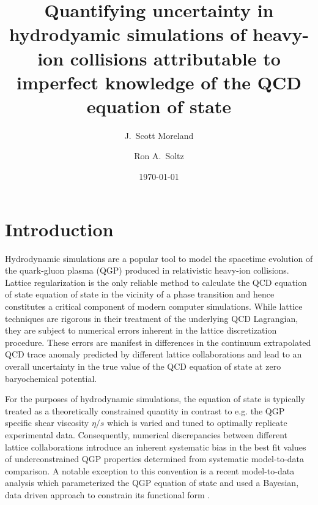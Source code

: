 \documentclass[aps,prc,reprint,amsmath,nofootinbib,superscriptaddress]{revtex4-1}
\begin{document}
\title{Quantifying uncertainty in hydrodyamic simulations of heavy-ion collisions attributable to imperfect knowledge of the 
QCD equation of state}

\author{J.\ Scott Moreland}
\author{Ron A.\ Soltz}

\date{\today}

\begin{abstract} 
   
\end{abstract}

\maketitle

\section{Introduction}

Hydrodynamic simulations are a popular tool to model the spacetime evolution of the quark-gluon plasma (QGP) produced in relativistic 
heavy-ion collisions. Lattice regularization is the only reliable method to calculate the QCD equation of state equation of state in 
the vicinity of a phase transition and hence constitutes a critical component of modern computer simulations. While lattice techniques 
are rigorous in their treatment of the underlying QCD Lagrangian, they are subject to numerical errors inherent in the lattice discretization 
procedure. These errors are manifest in differences in the continuum extrapolated QCD trace anomaly predicted by different 
lattice collaborations and lead to an overall uncertainty in the true value of the QCD equation of state at zero baryochemical potential.

For the purposes of hydrodynamic simulations, the equation of state is typically treated as a theoretically constrained quantity in contrast 
to e.g. the QGP specific shear viscosity $\eta/s$ which is varied and tuned to optimally replicate experimental data. Consequently, numerical 
discrepancies between different lattice collaborations introduce an inherent systematic bias in the best fit values of underconstrained QGP 
properties determined from systematic model-to-data comparison. A notable exception to this convention is a recent model-to-data analysis 
which parameterized the QGP equation of state and used a Bayesian, data driven approach to constrain its functional form \cite{Novak:2013bqa}. 
\end{document}
